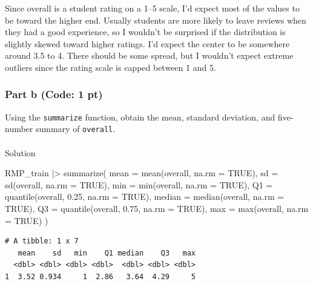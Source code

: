 \documentclass[
  letterpaper,
  DIV=11,
  numbers=noendperiod]{scrartcl}
\makeatletter
\let\oldparagraph\paragraph
\renewcommand{\paragraph}{
    \@ifstar
      \xxxParagraphStar
      \xxxParagraphNoStar
  }
\newcommand{\xxxParagraphStar}[1]{\oldparagraph*{#1}\mbox{}}
\newcommand{\xxxParagraphNoStar}[1]{\oldparagraph{#1}\mbox{}}
\newenvironment{Shaded}{\begin{snugshade}}{\end{snugshade}}
\newcommand{\AttributeTok}[1]{\textcolor[rgb]{0.40,0.45,0.13}{#1}}
\newcommand{\ConstantTok}[1]{\textcolor[rgb]{0.56,0.35,0.01}{#1}}
\newcommand{\FloatTok}[1]{\textcolor[rgb]{0.68,0.00,0.00}{#1}}
\newcommand{\FunctionTok}[1]{\textcolor[rgb]{0.28,0.35,0.67}{#1}}
\newcommand{\NormalTok}[1]{\textcolor[rgb]{0.00,0.23,0.31}{#1}}
\newcommand{\SpecialCharTok}[1]{\textcolor[rgb]{0.37,0.37,0.37}{#1}}
\makeatother
\begin{document}
Since overall is a student rating on a 1--5 scale, I'd expect most of
the values to be toward the higher end. Usually students are more likely
to leave reviews when they had a good experience, so I wouldn't be
surprised if the distribution is slightly skewed toward higher ratings.
I'd expect the center to be somewhere around 3.5 to 4. There should be
some spread, but I wouldn't expect extreme outliers since the rating
scale is capped between 1 and 5.

\subsubsection{Part b (Code: 1 pt)}\label{part-b-code-1-pt}

Using the \texttt{summarize} function, obtain the mean, standard
deviation, and five-number summary of \texttt{overall}.

\paragraph{Solution}\label{solution-1}

\begin{Shaded}
\begin{Highlighting}[]
\NormalTok{RMP\_train }\SpecialCharTok{|\textgreater{}}
  \FunctionTok{summarize}\NormalTok{(}
    \AttributeTok{mean =} \FunctionTok{mean}\NormalTok{(overall, }\AttributeTok{na.rm =} \ConstantTok{TRUE}\NormalTok{),}
    \AttributeTok{sd =} \FunctionTok{sd}\NormalTok{(overall, }\AttributeTok{na.rm =} \ConstantTok{TRUE}\NormalTok{),}
    \AttributeTok{min =} \FunctionTok{min}\NormalTok{(overall, }\AttributeTok{na.rm =} \ConstantTok{TRUE}\NormalTok{),}
    \AttributeTok{Q1 =} \FunctionTok{quantile}\NormalTok{(overall, }\FloatTok{0.25}\NormalTok{, }\AttributeTok{na.rm =} \ConstantTok{TRUE}\NormalTok{),}
    \AttributeTok{median =} \FunctionTok{median}\NormalTok{(overall, }\AttributeTok{na.rm =} \ConstantTok{TRUE}\NormalTok{),}
    \AttributeTok{Q3 =} \FunctionTok{quantile}\NormalTok{(overall, }\FloatTok{0.75}\NormalTok{, }\AttributeTok{na.rm =} \ConstantTok{TRUE}\NormalTok{),}
    \AttributeTok{max =} \FunctionTok{max}\NormalTok{(overall, }\AttributeTok{na.rm =} \ConstantTok{TRUE}\NormalTok{)}
\NormalTok{  )}
\end{Highlighting}
\end{Shaded}

\begin{verbatim}
# A tibble: 1 x 7
   mean    sd   min    Q1 median    Q3   max
  <dbl> <dbl> <dbl> <dbl>  <dbl> <dbl> <dbl>
1  3.52 0.934     1  2.86   3.64  4.29     5
\end{verbatim}
\end{document}
